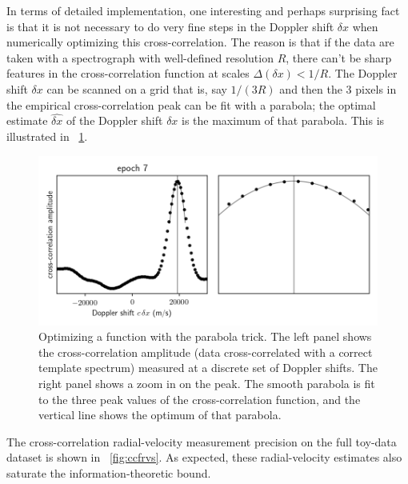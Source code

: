\documentclass[modern]{aastex631}
\newcommand{\figref}[1]{\figurename~\ref{#1}}
\begin{document}
In terms of detailed implementation, one interesting and perhaps surprising fact is that it is not necessary to do very fine steps in the Doppler shift $\delta x$ when numerically optimizing this cross-correlation.
The reason is that if the data are taken with a spectrograph with well-defined resolution $R$, there can't be sharp features in the cross-correlation function at scales $\Delta(\delta x)<1/R$.
The Doppler shift $\delta x$ can be scanned on a grid that is, say $1/(3R)$ and then the 3 pixels in the empirical cross-correlation peak can be fit with a parabola; the optimal estimate $\widehat{\delta x}$ of the Doppler shift $\delta x$ is the maximum of that parabola.
This is illustrated in \figref{fig:ccf}.

\begin{figure}[tp]
  \begin{mdframed}
    \begin{center}
    \includegraphics[width=\textwidth]{../notebook/ccf.png}
    \end{center}
    \caption{Optimizing a function with the parabola trick. The left panel shows the cross-correlation amplitude (data cross-correlated with a correct template spectrum) measured at a discrete set of Doppler shifts. The right panel shows a zoom in on the peak. The smooth parabola is fit to the three peak values of the cross-correlation function, and the vertical line shows the optimum of that parabola.\label{fig:ccf}}
  \end{mdframed}
\end{figure}

The cross-correlation radial-velocity measurement precision on the full toy-data dataset is shown in \figref{fig:ccfrvs}.
As expected, these radial-velocity estimates also saturate the information-theoretic bound.
\end{document}

